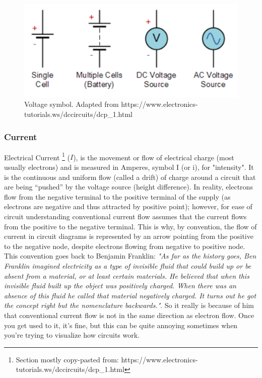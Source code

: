 \begin{figure}[H]
    \centering
    \includegraphics[width=0.65\linewidth]{../../Figures/Voltage.PNG}
    \caption{Voltage symbol. Adapted from https://www.electronics-tutorials.ws/dccircuits/dcp\_1.html}
    \label{fig:Resistors}
\end{figure}

\subsubsection{Current}

Electrical Current \footnote{Section mostly copy-pasted from: https://www.electronics-tutorials.ws/dccircuits/dcp\_1.html} ($I$), is the movement or flow of electrical charge (most usually electrons) and is measured in Amperes, symbol I (or i), for "intensity". It is the continuous and uniform flow (called a drift) of charge around a circuit that are being “pushed” by the voltage source (height difference). In reality, electrons flow from the negative terminal to the positive terminal of the supply (as electrons are negative and thus attracted by positive point); however, for ease of circuit understanding conventional current flow assumes that the current flows from the positive to the negative terminal.
This is why, by convention, the flow of current in circuit diagrams is represented by an arrow pointing from the positive to the negative node, despite electrons flowing from negative to positive node. This convention goes back to Benjamin Franklin: \textit{"As far as the history goes, Ben Franklin imagined electricity as a type of invisible fluid that could build up or be absent from a material, or at least certain materials. He believed that when this invisible fluid built up the object was positively charged. When there was an absence of this fluid he called that material negatively charged. It turns out he got the concept right but the nomenclature backwards."}. So it really is because of him that conventional current flow is not in the same direction as electron flow. Once you get used to it, it's fine, but this can be quite annoying sometimes when you're trying to visualize how circuits work. 

